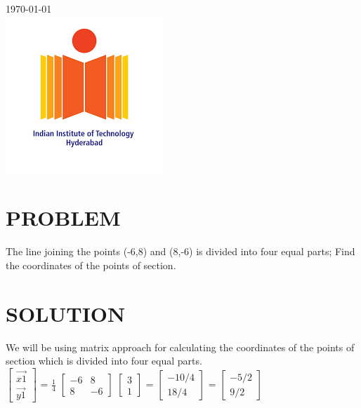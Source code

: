 \documentclass[12pt,a4paper,twoside]{article}
\begin{document}
\begin{titlepage}

{\large \today}\\[2cm] %


\includegraphics[scale=0.8]{logo iit h.png}\\ %
 

\vfill %

\end{titlepage}



\section{PROBLEM}
The line joining the points (-6,8) and (8,-6) is divided into four equal parts; Find the coordinates of the points of section.
\section{SOLUTION}
We will be using matrix approach for calculating the coordinates of the points of section which is divided into four equal parts.\\
$\begin{bmatrix}
\vec{x1}\\
\vec{y1}
\end{bmatrix}$
= $\frac{1}{4}$
$\begin{bmatrix}
-6 & 8\\
8 & -6
\end{bmatrix}$
$\begin{bmatrix}
3\\
1
\end{bmatrix}$
= $\begin{bmatrix}
-10/4\\
18/4
\end{bmatrix}$
=
$\begin{bmatrix}
-5/2\\
9/2
\end{bmatrix}$
\end{document}
